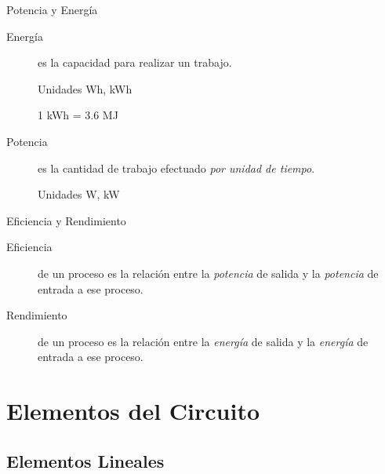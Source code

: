 \documentclass[xcolor={usenames,svgnames,dvipsnames}]{beamer}
\begin{document}
\begin{frame}[label={sec:org7c058f2}]{Potencia y Energía}
\begin{description}
\item[{Energía}] es la capacidad para realizar un trabajo.

Unidades Wh, kWh

1 kWh = 3.6 MJ

\item[{Potencia}] es la cantidad de trabajo efectuado \emph{por unidad de
tiempo}.

Unidades W, kW
\end{description}
\end{frame}

\begin{frame}[label={sec:org122e2ae}]{Eficiencia y Rendimiento}
\begin{description}
\item[{Eficiencia}] de un proceso es la relación entre la \emph{potencia} de
salida y la \emph{potencia} de entrada a ese proceso.

\item[{Rendimiento}] de un proceso es la relación entre la \emph{energía} de
salida y la \emph{energía} de entrada a ese proceso.
\end{description}
\end{frame}

\section{Elementos del Circuito}
\label{sec:org94d1f97}
\subsection{Elementos Lineales}
\label{sec:orgd428180}
\end{document}
